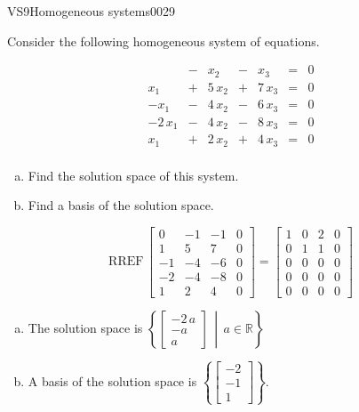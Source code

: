 \newpage




\begin{exercise}{VS9}{Homogeneous systems}{0029} 
\begin{exerciseStatement} 

Consider the following homogeneous system of equations.

 \[\begin{matrix}
 &  -  & x_{2} &  -  & x_{3} & = & 0 \\
 x_{1} &  +  & 5 \, x_{2} &  +  & 7 \, x_{3} & = & 0 \\
 -x_{1} &  -  & 4 \, x_{2} &  -  & 6 \, x_{3} & = & 0 \\
 -2 \, x_{1} &  -  & 4 \, x_{2} &  -  & 8 \, x_{3} & = & 0 \\
 x_{1} &  +  & 2 \, x_{2} &  +  & 4 \, x_{3} & = & 0 \\
 \end{matrix}\] 

\begin{enumerate}[(a)]
\item  Find the solution space of this system.
\item  Find a basis of the solution space.
\end{enumerate}

     \end{exerciseStatement}
 \begin{exerciseAnswer} 

\[\mathrm{RREF}\,\left[\begin{array}{ccc|c}
0 & -1 & -1 & 0 \\
1 & 5 & 7 & 0 \\
-1 & -4 & -6 & 0 \\
-2 & -4 & -8 & 0 \\
1 & 2 & 4 & 0
\end{array}\right]=\left[\begin{array}{ccc|c}
1 & 0 & 2 & 0 \\
0 & 1 & 1 & 0 \\
0 & 0 & 0 & 0 \\
0 & 0 & 0 & 0 \\
0 & 0 & 0 & 0
\end{array}\right]\]

 

\begin{enumerate}[(a)]
\item The solution space is \( \left\{ \left[\begin{array}{c}
-2 \, a \\
-a \\
a
\end{array}\right] \,\middle|\, a \in\mathbb R \right\} \) 
\item A basis of the solution space is \(\left\{ \left[\begin{array}{c}
-2 \\
-1 \\
1
\end{array}\right] \right\}\).
\end{enumerate}

     \end{exerciseAnswer}
 \end{exercise}



